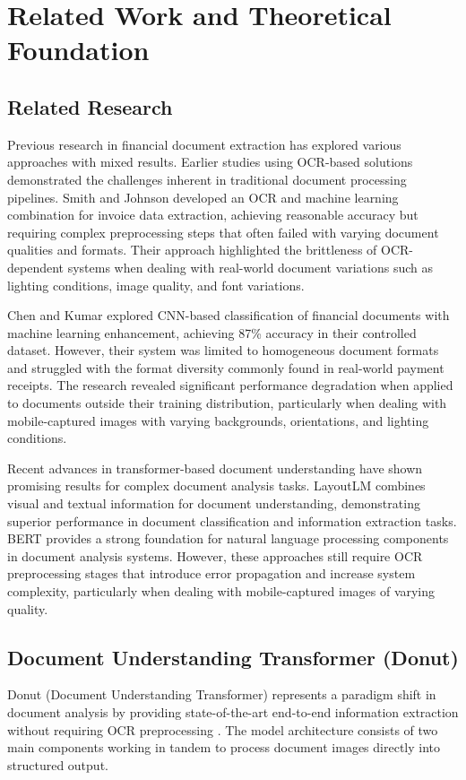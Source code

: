 \section{Related Work and Theoretical Foundation}

\subsection{Related Research}
Previous research in financial document extraction has explored various approaches with mixed results. Earlier studies using OCR-based solutions demonstrated the challenges inherent in traditional document processing pipelines. Smith and Johnson \cite{penelitian1} developed an OCR and machine learning combination for invoice data extraction, achieving reasonable accuracy but requiring complex preprocessing steps that often failed with varying document qualities and formats. Their approach highlighted the brittleness of OCR-dependent systems when dealing with real-world document variations such as lighting conditions, image quality, and font variations.

Chen and Kumar \cite{penelitian2} explored CNN-based classification of financial documents with machine learning enhancement, achieving 87\% accuracy in their controlled dataset. However, their system was limited to homogeneous document formats and struggled with the format diversity commonly found in real-world payment receipts. The research revealed significant performance degradation when applied to documents outside their training distribution, particularly when dealing with mobile-captured images with varying backgrounds, orientations, and lighting conditions.

Recent advances in transformer-based document understanding have shown promising results for complex document analysis tasks. LayoutLM \cite{layoutlm} combines visual and textual information for document understanding, demonstrating superior performance in document classification and information extraction tasks. BERT \cite{bert} provides a strong foundation for natural language processing components in document analysis systems. However, these approaches still require OCR preprocessing stages that introduce error propagation and increase system complexity, particularly when dealing with mobile-captured images of varying quality.

\subsection{Document Understanding Transformer (Donut)}
Donut (Document Understanding Transformer) represents a paradigm shift in document analysis by providing state-of-the-art end-to-end information extraction without requiring OCR preprocessing \cite{donut}. The model architecture consists of two main components working in tandem to process document images directly into structured output.

